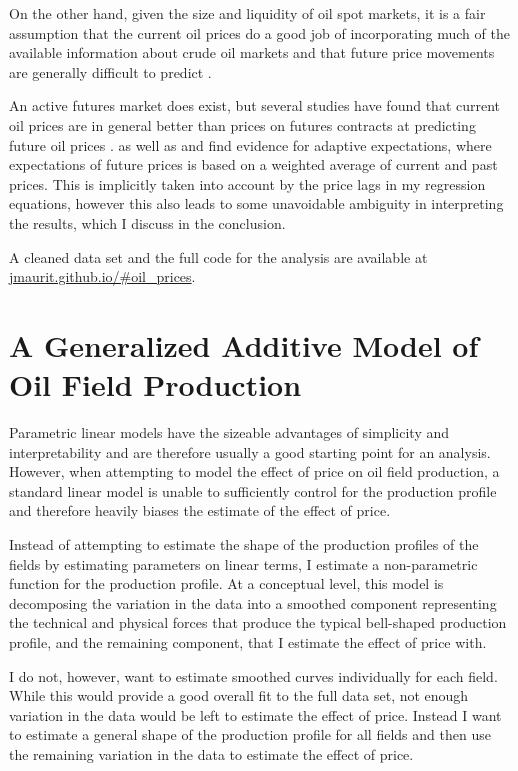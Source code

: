 \documentclass[12pt]{article}
\begin{document}
On the other hand, given the size and liquidity of oil spot markets, it is a fair assumption that the current oil prices do a good job of incorporating much of the available information about crude oil markets and that future price movements are generally difficult to predict \citep{hamilton_understanding_2008}.

An active futures market does exist, but several studies have found that current oil prices are in general better than prices on futures contracts at predicting future oil prices \citep{alquist_what_2010, chinn_predictive_2005}.  \citet{mohn_investment_2008} as well as \citet{pesaran_econometric_1990} and \citet{farzin_impact_2001} find evidence for adaptive expectations, where expectations of future prices is based on a weighted average of current and past prices. This is implicitly taken into account by the price lags in my regression equations, however this also leads to some unavoidable ambiguity in interpreting the results, which I discuss in the conclusion. 

A cleaned data set and the full code for the analysis are available at \url{jmaurit.github.io/#oil_prices}.

\section{A Generalized Additive Model of Oil Field Production}
Parametric linear models have the sizeable advantages of simplicity and interpretability and are therefore usually a good starting point for an analysis. However, when attempting to model the effect of price on oil field production, a standard linear model is unable to sufficiently control for the production profile and therefore heavily biases the estimate of the effect of price.
  
Instead of attempting to estimate the shape of the production profiles of the fields by estimating parameters on linear terms, I estimate a non-parametric function for the production profile. At a conceptual level, this model is decomposing the variation in the data into a smoothed component representing the technical and physical forces that produce the typical bell-shaped production profile, and the remaining component, that I estimate the effect of price with.  

I do not, however, want to estimate smoothed curves individually for each field. While this would provide a good overall fit to the full data set, not enough variation in the data would be left to estimate the effect of price.  Instead I want to estimate a general shape of the production profile for all fields and then use the remaining variation in the data to estimate the effect of price.  
\end{document}
